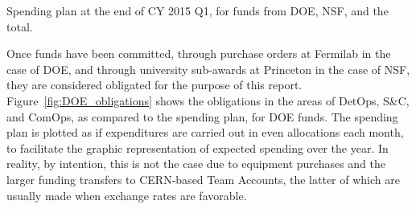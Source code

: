 \begin{table}[hbtp]
  \begin{center}
    \caption{Spending plan at the end of CY 2015 Q1, for funds from DOE, NSF, and the total.}
    \label{tab:spending_plan}
  \end{center}
\end{table}

Once funds have been committed, through purchase orders at Fermilab in the case of DOE, and
through university sub-awards at Princeton in the case of NSF, 
they are considered obligated for the purpose of this report.
Figure\ \ref{fig:DOE_obligations} shows the obligations in the areas of DetOps,
S\&C, and ComOps, as compared to the spending plan, for DOE funds.  The spending
plan is plotted as if expenditures are carried out in even allocations each month, to facilitate the graphic representation of expected spending over the year. In reality, by intention, this is not the case due to equipment purchases and the larger funding transfers to CERN-based
Team Accounts, the latter of which are usually made when exchange rates are favorable.

